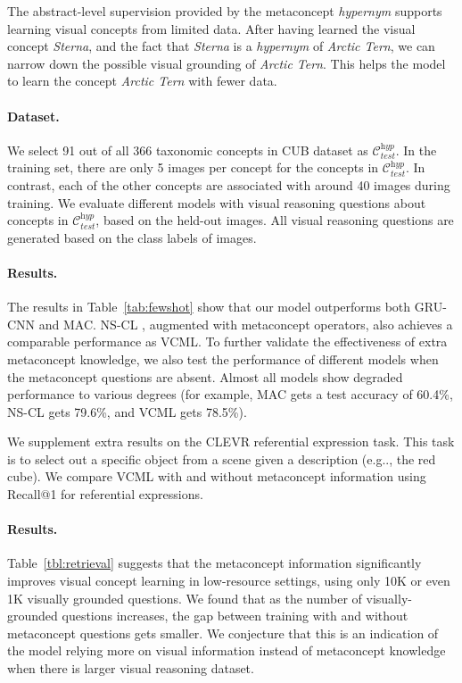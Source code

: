 \documentclass{article}
\makeatletter
\newcommand{\tbl}[1]{Table~\ref{#1}}
\DeclareRobustCommand\onedot{\futurelet\@let@token\@onedot}
\def\@onedot{\ifx\@let@token.\else.\null\fi\xspace}
\def\eg{e.g\onedot} \def\Eg{E.g\onedot}
\newcommand{\model}{VCML\xspace}
\newcommand{\myparagraph}[1]{\vspace{-10pt}\paragraph{#1}}
\makeatother
\begin{document}

The abstract-level supervision provided by the metaconcept {\it hypernym} supports learning visual concepts from limited data. After having learned the visual concept {\it Sterna}, and the fact that {\it Sterna} is a {\it hypernym} of {\it Arctic Tern}, we can narrow down the possible visual grounding of {\it Arctic Tern}. This helps the model to learn the concept {\it Arctic Tern} with fewer data.


\myparagraph{Dataset.}
We select 91 out of all 366 taxonomic concepts in CUB dataset \citep{CUB_200_2011} as $\mathcal{C}_\textit{test}^\textit{hyp}$. In the training set, there are only 5 images per concept for the concepts in $\mathcal{C}_\textit{test}^\textit{hyp}$. In contrast, each of the other concepts are associated with around 40 images during training. We evaluate different models with visual reasoning questions about concepts in $\mathcal{C}_\textit{test}^\textit{hyp}$, based on the held-out images. All visual reasoning questions are generated based on the class labels of images.


\myparagraph{Results.}
The results in \tbl{tab:fewshot} show that our model outperforms both GRU-CNN and MAC. NS-CL \citep{Mao2019NeuroSymbolic}, augmented with metaconcept operators, also achieves a comparable performance as \model. To further validate the effectiveness of extra metaconcept knowledge, we also test the performance of different models when the metaconcept questions are absent. Almost all models show degraded performance to various degrees (for example, MAC gets a test accuracy of 60.4\%, NS-CL gets 79.6\%, and \model gets 78.5\%).

We supplement extra results on the CLEVR referential expression task. This task is to select out a specific object from a scene given a description (\eg, the red cube). We compare VCML with and without metaconcept information using Recall@1 for referential expressions. 

\myparagraph{Results.}
\tbl{tbl:retrieval} suggests that the metaconcept information significantly improves visual concept learning in low-resource settings, using only 10K or even 1K visually grounded questions. We found that as the number of visually-grounded questions increases, the gap between training with and without metaconcept questions gets smaller. We conjecture that this is an indication of the model relying more on visual information instead of metaconcept knowledge when there is larger visual reasoning dataset.
\end{document}
